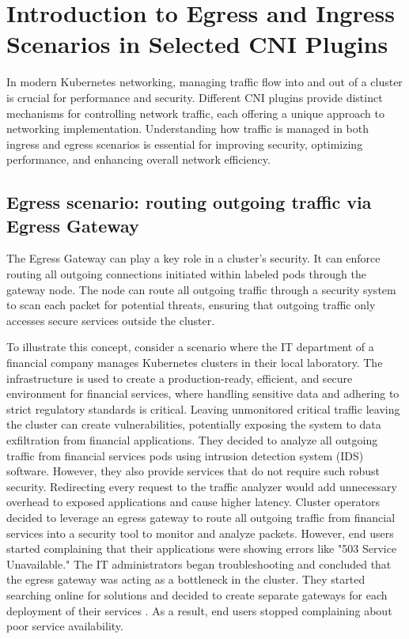 \chapter{Introduction to Egress and Ingress Scenarios in Selected CNI Plugins}
\label{cha:introScenarios}
In modern Kubernetes networking, managing traffic flow into and out of a cluster is crucial for performance and security. Different CNI plugins provide distinct mechanisms for controlling network traffic, each offering a unique approach to networking implementation. Understanding how traffic is managed in both ingress and egress scenarios is essential for improving security, optimizing performance, and enhancing overall network efficiency.

\section{Egress scenario: routing outgoing traffic via Egress Gateway}
\label{sec:egress}

The Egress Gateway can play a key role in a cluster's security. It can enforce routing all outgoing connections initiated within labeled pods through the gateway node. The node can route all outgoing traffic through a security system to scan each packet for potential threats, ensuring that outgoing traffic only accesses secure services outside the cluster.

To illustrate this concept, consider a scenario where the IT department of a financial company manages Kubernetes clusters in their local laboratory. The infrastructure is used to create a production-ready, efficient, and secure environment for financial services, where handling sensitive data and adhering to strict regulatory standards is critical. Leaving unmonitored critical traffic leaving the cluster can create vulnerabilities, potentially exposing the system to data exfiltration from financial applications. They decided to analyze all outgoing traffic from financial services pods using intrusion detection system (IDS) software. However, they also provide services that do not require such robust security. Redirecting every request to the traffic analyzer would add unnecessary overhead to exposed applications and cause higher latency. Cluster operators decided to leverage an egress gateway to route all outgoing traffic from financial services into a security tool to monitor and analyze packets. However, end users started complaining that their applications were showing errors like "503 Service Unavailable." The IT administrators began troubleshooting and concluded that the egress gateway was acting as a bottleneck in the cluster. They started searching online for solutions and decided to create separate gateways for each deployment of their services \cite{CalicoEgressDeploy}. As a result, end users stopped complaining about poor service availability.

